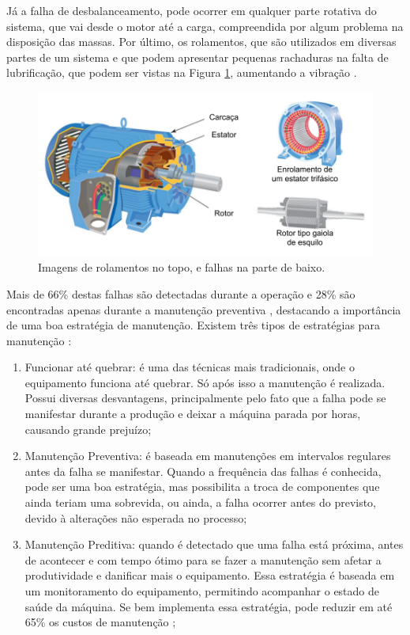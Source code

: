 Já a falha de desbalanceamento, pode ocorrer em qualquer parte rotativa do sistema, que vai desde o motor até a carga, compreendida por
algum problema na disposição das massas. Por último, os rolamentos, que são utilizados em diversas partes de um sistema e que podem
apresentar pequenas rachaduras na falta de lubrificação, que podem ser vistas na Figura \ref{fig:bearing_analog_p3}, aumentando a 
vibração \cite{Sopcik2019}.

\begin{figure}[H]
    \caption{Imagens de rolamentos no topo, e falhas na parte de baixo.}
    \begin{center}
        \includegraphics[scale=0.85, page=4]{referencial/img/imagens_referencial.pdf}
    \end{center}
    \label{fig:bearing_analog_p3}
\end{figure}

Mais de 66\% destas falhas são detectadas durante a operação e 28\% são encontradas apenas durante a manutenção 
preventiva \cite{Gorbounov2018}, destacando a importância de uma boa estratégia de manutenção. Existem três tipos de estratégias 
para manutenção \cite{Wu2013}:  

\begin{enumerate}
    \item Funcionar até quebrar: é uma das técnicas mais tradicionais, onde o equipamento funciona até quebrar. Só após isso a
manutenção é realizada. Possui diversas desvantagens, principalmente pelo fato que a falha pode se manifestar durante a produção e
deixar a máquina parada por horas, causando grande prejuízo;
    \item Manutenção Preventiva: é baseada em manutenções em intervalos regulares antes da falha se manifestar. Quando a frequência das
falhas é conhecida, pode ser uma boa estratégia, mas possibilita a troca de componentes que ainda teriam uma sobrevida, ou ainda, a falha
ocorrer antes do previsto, devido à alterações não esperada no processo;
    \item Manutenção Preditiva: quando é detectado que uma falha está próxima, antes de acontecer e com tempo ótimo para se fazer a 
manutenção sem afetar a produtividade e danificar mais o equipamento. Essa estratégia é baseada em um monitoramento do equipamento,
permitindo acompanhar o estado de saúde da máquina. Se bem implementa essa estratégia, pode reduzir em até 65\% os custos de manutenção
\cite{Wu2013};
\end{enumerate}

